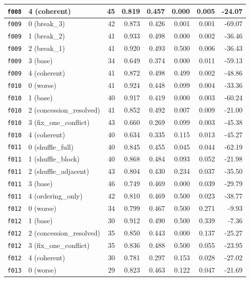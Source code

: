 \documentclass[11pt]{article}
\begin{document}
\begin{table}[htbp]
\begin{tabular}{llrrrrrr}
\texttt{f008} & 4 (coherent) & 45 & 0.819 & 0.457 & 0.000 & 0.005 & -24.07 \\
\midrule
\texttt{f009} & 0 (break\_3) & 42 & 0.873 & 0.426 & 0.001 & 0.001 & -69.07 \\
\texttt{f009} & 1 (break\_2) & 41 & 0.933 & 0.498 & 0.000 & 0.002 & -36.46 \\
\texttt{f009} & 2 (break\_1) & 41 & 0.920 & 0.493 & 0.500 & 0.006 & -36.43 \\
\texttt{f009} & 3 (base) & 34 & 0.649 & 0.374 & 0.000 & 0.011 & -59.13 \\
\texttt{f009} & 4 (coherent) & 41 & 0.872 & 0.498 & 0.499 & 0.002 & -48.86 \\
\midrule
\texttt{f010} & 0 (worse) & 41 & 0.924 & 0.448 & 0.099 & 0.004 & -33.36 \\
\texttt{f010} & 1 (base) & 40 & 0.917 & 0.419 & 0.000 & 0.003 & -60.24 \\
\texttt{f010} & 2 (concession\_resolved) & 41 & 0.852 & 0.492 & 0.007 & 0.009 & -21.00 \\
\texttt{f010} & 3 (fix\_one\_conflict) & 43 & 0.660 & 0.269 & 0.099 & 0.003 & -45.38 \\
\texttt{f010} & 4 (coherent) & 40 & 0.634 & 0.335 & 0.115 & 0.013 & -45.27 \\
\midrule
\texttt{f011} & 0 (shuffle\_full) & 40 & 0.845 & 0.455 & 0.045 & 0.044 & -62.19 \\
\texttt{f011} & 1 (shuffle\_block) & 40 & 0.868 & 0.484 & 0.093 & 0.052 & -21.98 \\
\texttt{f011} & 2 (shuffle\_adjacent) & 43 & 0.804 & 0.430 & 0.234 & 0.037 & -35.50 \\
\texttt{f011} & 3 (base) & 46 & 0.749 & 0.469 & 0.000 & 0.039 & -29.79 \\
\texttt{f011} & 4 (ordering\_only) & 42 & 0.810 & 0.469 & 0.500 & 0.023 & -38.77 \\
\midrule
\texttt{f012} & 0 (worse) & 34 & 0.799 & 0.467 & 0.500 & 0.271 & -9.93 \\
\texttt{f012} & 1 (base) & 30 & 0.912 & 0.490 & 0.500 & 0.339 & -7.36 \\
\texttt{f012} & 2 (concession\_resolved) & 35 & 0.850 & 0.443 & 0.000 & 0.137 & -25.27 \\
\texttt{f012} & 3 (fix\_one\_conflict) & 35 & 0.836 & 0.488 & 0.500 & 0.055 & -23.95 \\
\texttt{f012} & 4 (coherent) & 30 & 0.781 & 0.297 & 0.153 & 0.028 & -27.02 \\
\midrule
\texttt{f013} & 0 (worse) & 29 & 0.823 & 0.463 & 0.122 & 0.047 & -21.69 \\

\end{tabular}
\end{table}
\end{document}
